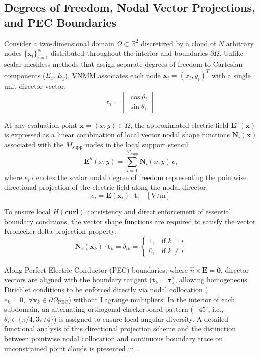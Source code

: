 \documentclass[11pt,a4paper]{article}
\begin{document}
\subsection{Degrees of Freedom, Nodal Vector Projections, and PEC Boundaries}
Consider a two-dimensional domain $\Omega \subset \mathbb{R}^2$ discretized by a cloud of $N$ arbitrary nodes $\{\mathbf{x}_i\}_{i=1}^N$ distributed throughout the interior and boundaries $\partial\Omega$. Unlike scalar meshless methods that assign separate degrees of freedom to Cartesian components ($E_x, E_y$), VNMM associates each node $\mathbf{x}_i = (x_i, y_i)^T$ with a single unit director vector:
\begin{equation}
\mathbf{t}_i = \begin{bmatrix} \cos\theta_i \\ \sin\theta_i \end{bmatrix}
\end{equation}

At any evaluation point $\mathbf{x} = (x, y) \in \Omega$, the approximated electric field $\mathbf{E}^h(\mathbf{x})$ is expressed as a linear combination of local vector nodal shape functions $\mathbf{N}_i(\mathbf{x})$ associated with the $M_{\mathrm{supp}}$ nodes in the local support stencil:
\begin{equation}
\mathbf{E}^h(x, y) = \sum_{i=1}^{M_{\mathrm{supp}}} \mathbf{N}_i(x, y)\, e_i
\end{equation}
where $e_i$ denotes the scalar nodal degree of freedom representing the pointwise directional projection of the electric field along the nodal director:
\begin{equation}
e_i = \mathbf{E}(\mathbf{x}_i) \cdot \mathbf{t}_i \quad [\text{V/m}]
\end{equation}

To ensure local $H(\mathbf{curl})$ consistency and direct enforcement of essential boundary conditions, the vector shape functions are required to satisfy the vector Kronecker delta projection property:
\begin{equation}
\mathbf{N}_i(\mathbf{x}_k) \cdot \mathbf{t}_k = \delta_{ik} = \begin{cases} 1, & \text{if } k = i \\ 0, & \text{if } k \neq i \end{cases}
\end{equation}

Along Perfect Electric Conductor (PEC) boundaries, where $\hat{n} \times \mathbf{E} = \mathbf{0}$, director vectors are aligned with the boundary tangent ($\mathbf{t}_k = \boldsymbol{\tau}$), allowing homogeneous Dirichlet conditions to be enforced directly via nodal collocation ($e_k = 0, \; \forall \mathbf{x}_k \in \partial\Omega_{\mathrm{PEC}}$) without Lagrange multipliers. In the interior of each subdomain, an alternating orthogonal checkerboard pattern ($\pm 45^\circ$, i.e., $\theta_i \in \{\pi/4, 3\pi/4\}$) is assigned to ensure local angular diversity. A detailed functional analysis of this directional projection scheme and the distinction between pointwise nodal collocation and continuous boundary trace on unconstrained point clouds is presented in \cite{mesquita_eabe}.
\end{document}
